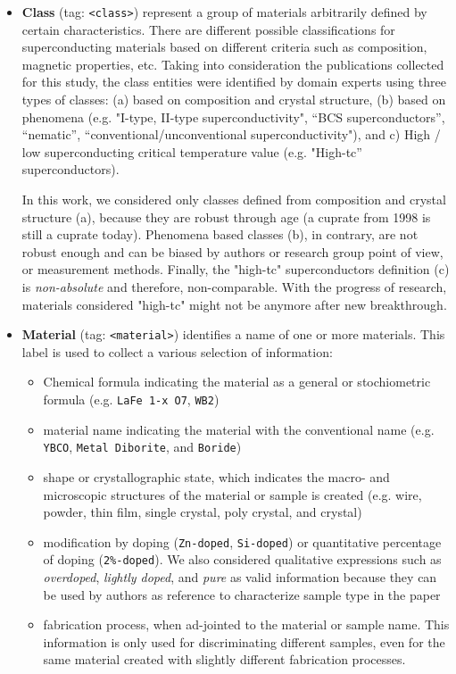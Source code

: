 \documentclass[fleqn,10pt]{wlscirep}
\begin{document}
\begin{itemize}
\item \textbf{Class} (tag: \texttt{<class>}) represent a group of materials arbitrarily defined by certain characteristics.
There are different  possible classifications for superconducting materials  based on different criteria such as composition, magnetic properties, etc. Taking into consideration the publications collected for this study, the class entities were identified by domain experts using three types of classes: (a) based on composition and crystal structure, (b) based on phenomena (e.g. "I-type, II-type superconductivity", “BCS superconductors”, “nematic”, “conventional/unconventional superconductivity"), and c) High / low superconducting critical temperature value (e.g. "High-tc” superconductors). 

In this work, we considered only classes defined from composition and crystal structure (a), because they are robust through age (a cuprate from 1998 is still a cuprate today). 
Phenomena based classes (b), in contrary, are not robust enough and can be biased by authors or research group point of view, or measurement methods. 
Finally, the "high-tc" superconductors definition (c) is \textit{non-absolute} and therefore, non-comparable. With the progress of research, materials considered "high-tc" might not be anymore after new breakthrough.

\item  \textbf{Material} (tag: \texttt{<material>}) identifies a name of one or more materials. 
This label is used to collect a various selection of information: 
\begin{itemize}
    \item Chemical formula indicating the material as a general or stochiometric formula (e.g. \texttt{LaFe 1-x O7}, \texttt{WB2})
    \item material name indicating the material with the conventional name (e.g. \texttt{YBCO}, \texttt{Metal Diborite}, and \texttt{Boride})
    \item shape or crystallographic state, which indicates the macro- and microscopic structures of the material or sample is created (e.g. wire, powder, thin film, single crystal, poly crystal, and crystal)
    \item modification by doping (\texttt{Zn-doped}, \texttt{Si-doped}) or quantitative percentage of doping (\texttt{2\%-doped}). We also considered qualitative expressions such as \textit{overdoped}, \textit{lightly doped}, and \textit{pure} as valid information because they can be used by authors as reference to characterize sample type in the paper 
    \item fabrication process, when ad-jointed to the material or sample name. This information is only used for discriminating different samples, even for the same material created with slightly different fabrication processes. 
\end{itemize}


\end{itemize}
\end{document}
